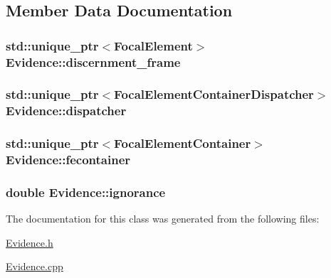 \subsection{Member Data Documentation}
\hypertarget{classEvidence_a4564fa5d7963b912d66549ac33d86dfd}{}
\subsubsection[{discernment\+\_\+frame}]{\setlength{\rightskip}{0pt plus 5cm}std\+::unique\+\_\+ptr$<${\bf Focal\+Element}$>$ Evidence\+::discernment\+\_\+frame\hspace{0.3cm}{\ttfamily [protected]}}\label{classEvidence_a4564fa5d7963b912d66549ac33d86dfd}
\hypertarget{classEvidence_a8ae2742750940957698135fd9014d6d4}{}
\subsubsection[{dispatcher}]{\setlength{\rightskip}{0pt plus 5cm}std\+::unique\+\_\+ptr$<${\bf Focal\+Element\+Container\+Dispatcher}$>$ Evidence\+::dispatcher\hspace{0.3cm}{\ttfamily [protected]}}\label{classEvidence_a8ae2742750940957698135fd9014d6d4}
\hypertarget{classEvidence_a1476adbcd8bc99817cc77b338b50cdef}{}
\subsubsection[{fecontainer}]{\setlength{\rightskip}{0pt plus 5cm}std\+::unique\+\_\+ptr$<${\bf Focal\+Element\+Container}$>$ Evidence\+::fecontainer\hspace{0.3cm}{\ttfamily [protected]}}\label{classEvidence_a1476adbcd8bc99817cc77b338b50cdef}
\hypertarget{classEvidence_a77a5358b14a274c62a6b229ec4f844a0}{}
\subsubsection[{ignorance}]{\setlength{\rightskip}{0pt plus 5cm}double Evidence\+::ignorance\hspace{0.3cm}{\ttfamily [protected]}}\label{classEvidence_a77a5358b14a274c62a6b229ec4f844a0}


The documentation for this class was generated from the following files\+:\begin{DoxyCompactItemize}
\item 
\hyperlink{Evidence_8h}{Evidence.\+h}\item 
\hyperlink{Evidence_8cpp}{Evidence.\+cpp}\end{DoxyCompactItemize}

